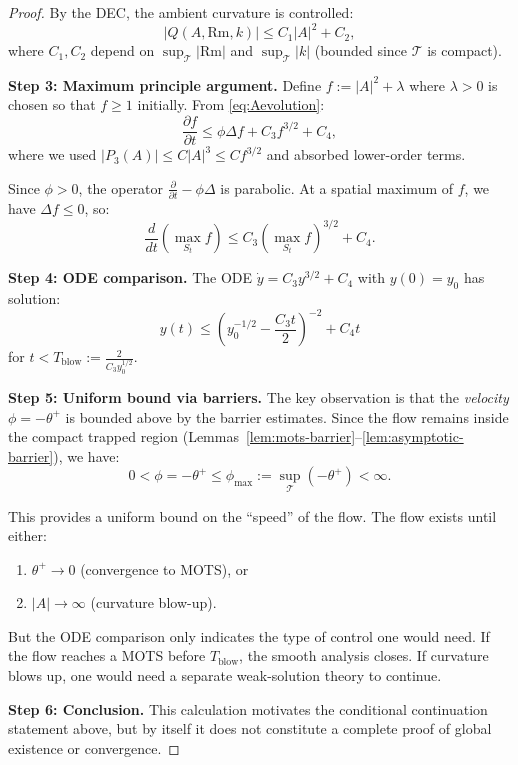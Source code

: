 \begin{proof}
By the DEC, the ambient curvature is controlled:
\begin{equation}
    |Q(A, \mathrm{Rm}, k)| \le C_1 |A|^2 + C_2,
\end{equation}
where $C_1, C_2$ depend on $\sup_{\mathcal{T}} |\mathrm{Rm}|$ and $\sup_{\mathcal{T}} |k|$ (bounded since $\mathcal{T}$ is compact).

\textbf{Step 3: Maximum principle argument.}
Define $f := |A|^2 + \lambda$ where $\lambda > 0$ is chosen so that $f \ge 1$ initially. From \eqref{eq:Aevolution}:
\begin{equation}
    \frac{\partial f}{\partial t} \le \phi \Delta f + C_3 f^{3/2} + C_4,
\end{equation}
where we used $|P_3(A)| \le C|A|^3 \le C f^{3/2}$ and absorbed lower-order terms.

Since $\phi > 0$, the operator $\frac{\partial}{\partial t} - \phi\Delta$ is parabolic. At a spatial maximum of $f$, we have $\Delta f \le 0$, so:
\begin{equation}
    \frac{d}{dt}(\max_{S_t} f) \le C_3 (\max_{S_t} f)^{3/2} + C_4.
\end{equation}

\textbf{Step 4: ODE comparison.}
The ODE $\dot{y} = C_3 y^{3/2} + C_4$ with $y(0) = y_0$ has solution:
\begin{equation}
    y(t) \le \left( y_0^{-1/2} - \frac{C_3 t}{2} \right)^{-2} + C_4 t
\end{equation}
for $t < T_{\mathrm{blow}} := \frac{2}{C_3 y_0^{1/2}}$.

\textbf{Step 5: Uniform bound via barriers.}
The key observation is that the \emph{velocity} $\phi = -\theta^+$ is bounded above by the barrier estimates. Since the flow remains inside the compact trapped region (Lemmas~\ref{lem:mots-barrier}--\ref{lem:asymptotic-barrier}), we have:
\begin{equation}
    0 < \phi = -\theta^+ \le \phi_{\max} := \sup_{\mathcal{T}} (-\theta^+) < \infty.
\end{equation}

This provides a uniform bound on the ``speed'' of the flow. The flow exists until either:
\begin{enumerate}
    \item $\theta^+ \to 0$ (convergence to MOTS), or
    \item $|A| \to \infty$ (curvature blow-up).
\end{enumerate}

But the ODE comparison only indicates the type of control one would need. If the flow reaches a MOTS before $T_{\mathrm{blow}}$, the smooth analysis closes. If curvature blows up, one would need a separate weak-solution theory to continue.

\textbf{Step 6: Conclusion.}
This calculation motivates the conditional continuation statement above, but by itself it does not constitute a complete proof of global existence or convergence.
\end{proof}

